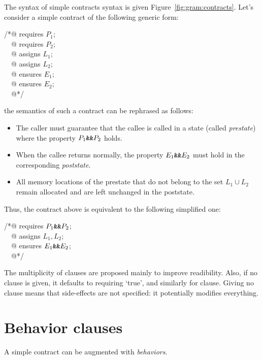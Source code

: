 \documentclass[a4paper,11pt,twoside,openright]{report}
\begin{document}
The syntax of simple contracts syntax is given
Figure~\ref{fig:gram:contracts}. Let's consider a simple contract of the following
generic form:
\begin{flushleft}\ttfamily
/*@ requires $P_1$; \\
~~@ requires $P_2$; \\
~~@ assigns $L_1$; \\
~~@ assigns $L_2$; \\
~~@ ensures $E_1$; \\
~~@ ensures $E_2$; \\
~~@*/
\end{flushleft}
the semantics of such a contract can be rephrased as follows:
\begin{itemize}
\item The caller must guarantee that the callee is called in a
  state (called \emph{prestate})  where the property $P_1 \verb|&&| P_2$ holds.
\item When the callee returns normally, the property
  $E_1 \verb|&&| E_2$ must hold in the corresponding \emph{poststate}.
\item All memory locations of the prestate that do not belong to the
  set $L_1 \cup L_2$ remain allocated and are left unchanged in the
  poststate.
\end{itemize}
Thus, the contract above is equivalent to the following
simplified one:
\begin{flushleft}\ttfamily
/*@ requires $P_1 \verb|&&| P_2$; \\
~~@ assigns $L_1,L_2$; \\
~~@ ensures $E_1 \verb|&&| E_2$; \\
~~@*/
\end{flushleft}
The multiplicity of clauses are proposed mainly to improve
readibility. Also, if no clause  is given, it defaults
to requiring `true', and similarly for  clause. Giving no
 clause means that side-effects are not specified: it
potentially modifies everything.


\section{Behavior clauses}
\label{sec:behaviors}

A simple contract can be augmented with \emph{behaviors}.
\end{document}
